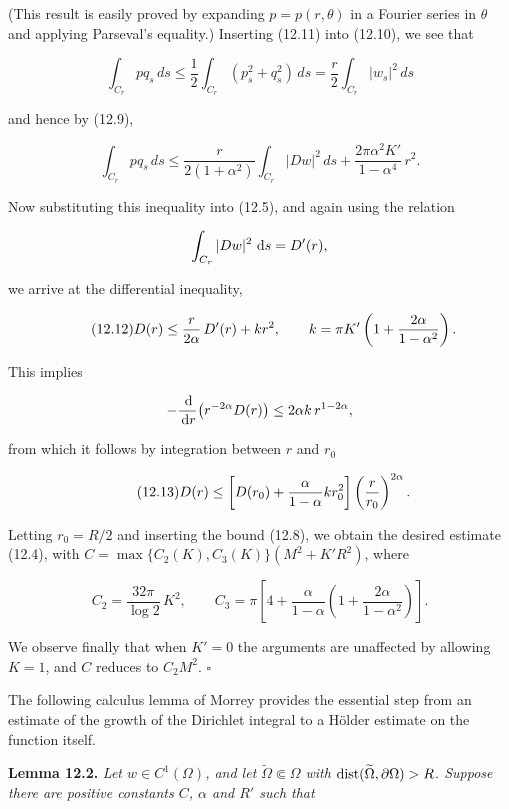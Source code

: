 (This result is easily proved by expanding $p = p(r,\theta)$ in a Fourier series in $\theta$ and applying Parseval’s equality.) Inserting (12.11) into (12.10), we see that

\[
\int_{C_r} p q_s\, ds \leq \frac{1}{2}\int_{C_r}(p_s^2 + q_s^2)\, ds = \frac{r}{2}\int_{C_r}|w_s|^2\, ds
\]

and hence by (12.9),

\[
\int_{C_r} p q_s\, ds \leq \frac{r}{2(1+\alpha^2)}\int_{C_r}|Dw|^2\, ds + \frac{2\pi\alpha^2K'}{1-\alpha^4}\,r^2.
\]



Now substituting this inequality into (12.5), and again using the relation

\[
\int_{C_r} |Dw|^2\, \,\mathrm{d} s = D'(r),
\]

we arrive at the differential inequality,

\begin{equation}\tag{12.12}
D(r)\le \frac{r}{2\alpha}\,D'(r)+kr^2,\qquad
k=\pi K'\left(1+\frac{2\alpha}{1-\alpha^2}\right).
\end{equation}

This implies

\[
-\frac{\,\mathrm{d}}{\,\mathrm{d} r}\bigl(r^{-2\alpha}D(r)\bigr)\le 2\alpha k\, r^{1-2\alpha},
\]

from which it follows by integration between $r$ and $r_0$

\begin{equation}\tag{12.13}
D(r)\le \left[D(r_0)+\frac{\alpha}{1-\alpha}kr_0^2\right]
\left(\frac{r}{r_0}\right)^{2\alpha}.
\end{equation}

Letting $r_0=R/2$ and inserting the bound (12.8), we obtain the desired estimate
(12.4), with $C=\max\{C_2(K),C_3(K)\}(M^2+K'R^2)$, where

\[
C_2=\frac{32\pi}{\log 2}\,K^2,\qquad
C_3=\pi\left[4+\frac{\alpha}{1-\alpha}\left(1+\frac{2\alpha}{1-\alpha^2}\right)\right].
\]

We observe finally that when $K'=0$ the arguments are unaffected by allowing
$K=1$, and $C$ reduces to $C_2M^2$. $\square$

The following calculus lemma of Morrey provides the essential step from an
estimate of the growth of the Dirichlet integral to a Hölder estimate on the function
itself.

\medskip

\noindent\textbf{Lemma 12.2.} \textit{Let $w\in C^1(\Omega)$, and let $\widetilde{\Omega}\Subset\Omega$ with
$\operatorname{dist}(\widetilde{\Omega},\partial\Omega)>R$. Suppose there are positive constants $C$,
$\alpha$ and $R'$ such that}

